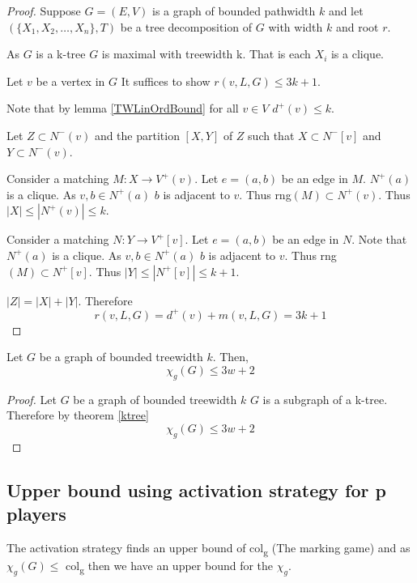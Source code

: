 \begin{proof}
    Suppose $G=(E,V)$ is a graph of bounded pathwidth $k$ and let $(\{X_1,X_2,\dots,X_n\},T)$ be a tree decomposition of $G$ with width $k$ and root $r$.
    
    As $G$ is a k-tree $G$ is maximal with treewidth k. That is each $X_i$ is a clique.
    
    Let $v$ be a vertex in $G$ It suffices to show $r(v,L,G) \leq 3k + 1$.
    
    
    Note that by lemma \ref{TWLinOrdBound} for all $v \in V$ $d^+(v) \leq k$.
    
    Let $Z \subset N^-(v)$ and the partition $[X,Y]$ of $Z$ such that $X\subset N^-[v]$ and  $Y\subset N^-(v)$.
           
    Consider a matching $M\colon X \to V^+(v)$. Let $e=(a,b)$ be an edge in $M$.
    $N^+(a)$ is a clique. As $v,b\in N^+(a)$ $b$ is adjacent to $v$. Thus rng$(M)\subset N^+(v)$. Thus $|X| \leq |N^+(v)| \leq k$. 
    
    Consider a matching $N\colon Y \to V^+[v]$. Let $e=(a,b)$ be an edge in $N$.
    Note that $N^+(a)$ is a clique. As $v,b\in N^+(a)$ $b$ is adjacent to $v$. Thus rng$(M)\subset N^+[v]$. Thus $|Y| \leq |N^+[v]| \leq k+1$. 
        
    $|Z| = |X|+|Y|$. Therefore \[r(v,L,G) = d^+(v) + m(v,L,G) = 3k +1\]        
\end{proof}

\begin{corollary}
    Let $G$ be a graph of bounded treewidth $k$. Then, 
    \[\chi_g(G) \leq 3w + 2\]
\end{corollary}

\begin{proof}
    Let $G$ be a graph of bounded treewidth $k$
    $G$ is a subgraph of a k-tree. Therefore by theorem \ref{ktree} \[\chi_g(G) \leq 3w + 2\]
\end{proof}

\subsection{Upper bound using activation strategy for p players}

The activation strategy finds an upper bound of col\textsubscript{g} (The marking game) and as $\chi_g(G) \leq$ col\textsubscript{g} then we have an upper bound for the $\chi_g$. 

